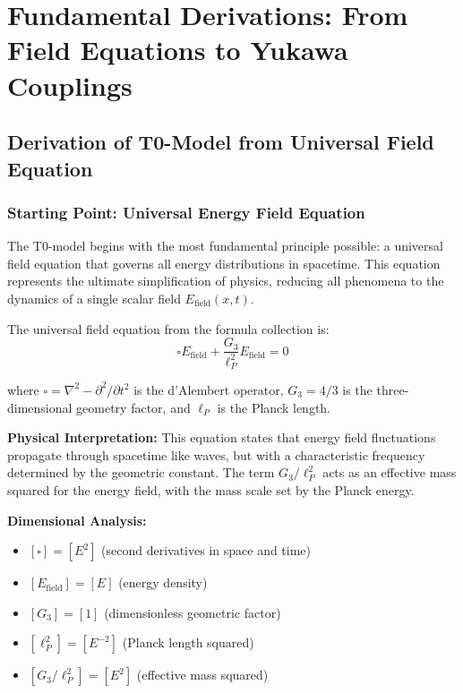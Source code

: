 \documentclass[12pt,a4paper]{article}
\begin{document}
	\section{Fundamental Derivations: From Field Equations to Yukawa Couplings}
	
	\subsection{Derivation of T0-Model from Universal Field Equation}
	
	\subsubsection{Starting Point: Universal Energy Field Equation}
	
	The T0-model begins with the most fundamental principle possible: a universal field equation that governs all energy distributions in spacetime. This equation represents the ultimate simplification of physics, reducing all phenomena to the dynamics of a single scalar field $E_{\text{field}}(x,t)$.
	
	The universal field equation from the formula collection is:
	\begin{equation}
		\boxed{\square E_{\text{field}} + \frac{G_3}{\ell_P^2} E_{\text{field}} = 0}
	\end{equation}
	
	where $\square = \nabla^2 - \partial^2/\partial t^2$ is the d'Alembert operator, $G_3 = 4/3$ is the three-dimensional geometry factor, and $\ell_P$ is the Planck length.
	
	\textbf{Physical Interpretation:} This equation states that energy field fluctuations propagate through spacetime like waves, but with a characteristic frequency determined by the geometric constant. The term $G_3/\ell_P^2$ acts as an effective mass squared for the energy field, with the mass scale set by the Planck energy.
	
	\textbf{Dimensional Analysis:}
	\begin{itemize}
		\item $[\square] = [E^2]$ (second derivatives in space and time)
		\item $[E_{\text{field}}] = [E]$ (energy density)
		\item $[G_3] = [1]$ (dimensionless geometric factor)
		\item $[\ell_P^2] = [E^{-2}]$ (Planck length squared)
		\item $[G_3/\ell_P^2] = [E^2]$ (effective mass squared)
	\end{itemize}
	
\end{document}
